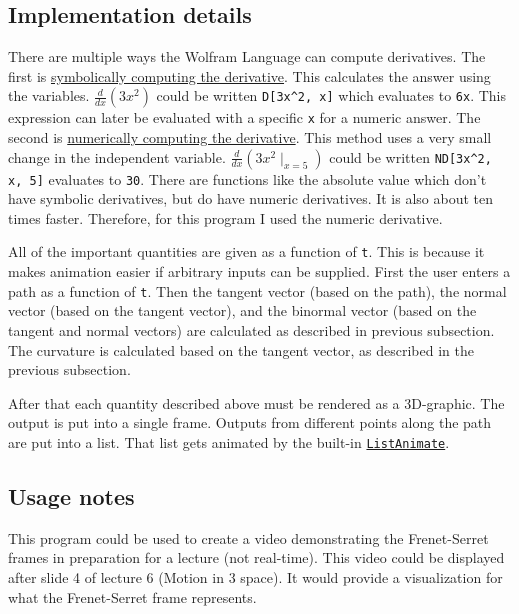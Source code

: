 \subsection*{Implementation details}

There are multiple ways the Wolfram Language can compute derivatives. The first is \href{https://reference.wolfram.com/language/ref/D.html}{symbolically computing the derivative}. This calculates the answer using the variables. \(\frac{d}{dx}(3x^2)\) could be written \verb+D[3x^2, x]+ which evaluates to \verb+6x+. This expression can later be evaluated with a specific \verb+x+ for a numeric answer. The second is \href{http://reference.wolfram.com/language/NumericalCalculus/ref/ND.html}{numerically computing the derivative}. This method uses a very small change in the independent variable. \(\frac{d}{dx}(3x^2\mid_{x=5})\) could be written \verb+ND[3x^2, x, 5]+ evaluates to \verb+30+. There are functions like the absolute value which don't have symbolic derivatives, but do have numeric derivatives. It is also about ten times faster. Therefore, for this program I used the numeric derivative.

All of the important quantities are given as a function of \verb+t+. This is because it makes animation easier if arbitrary inputs can be supplied. First the user enters a path as a function of \verb+t+. Then the tangent vector (based on the path), the normal vector (based on the tangent vector), and the binormal vector (based on the tangent and normal vectors) are calculated as described in previous subsection. The curvature is calculated based on the tangent vector, as described in the previous subsection.

After that each quantity described above must be rendered as a 3D-graphic. The output is put into a single frame. Outputs from different points along the path are put into a list. That list gets animated by the built-in \href{https://reference.wolfram.com/language/ref/ListAnimate.html}{\verb+ListAnimate+}.

\subsection*{Usage notes}

This program could be used to create a video demonstrating the Frenet-Serret frames in preparation for a lecture (not real-time). This video could be displayed after slide 4 of lecture 6 (Motion in 3 space). It would provide a visualization for what the Frenet-Serret frame represents.

